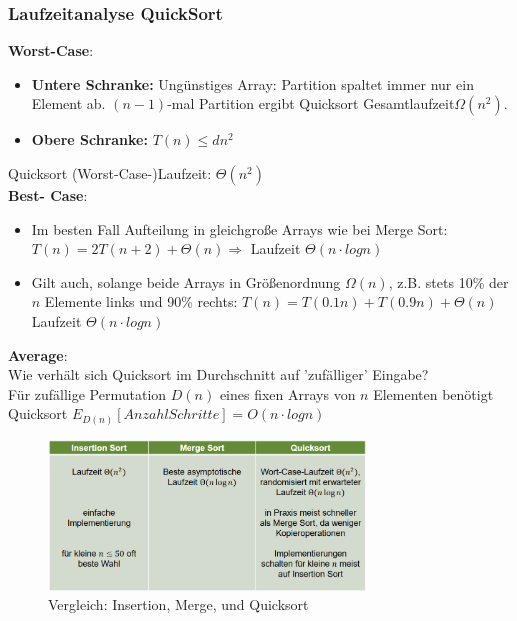 \documentclass{article}
\begin{document}
            \subsubsection{Laufzeitanalyse QuickSort}
                \textbf{Worst-Case}:
                \begin{itemize}
                    \item \textbf{Untere Schranke:} Ungünstiges Array: Partition spaltet immer nur ein Element ab. $(n-1)$-mal Partition ergibt Quicksort Gesamtlaufzeit$\Omega(n^2)$.
                    \item \textbf{Obere Schranke:} $T(n)\leq dn^2$
                \end{itemize}
                Quicksort (Worst-Case-)Laufzeit: $\Theta(n^2)$\\
                \textbf{Best- Case}:
                \begin{itemize}
                    \item Im besten Fall Aufteilung in gleichgroße Arrays wie bei Merge Sort: $T(n)=2T(n+2)+\Theta(n) \Rightarrow$ Laufzeit $\Theta(n\cdot log n)$
                \item Gilt auch, solange beide Arrays in Größenordnung $\Omega(n)$, z.B. stets 10\% der $n$ Elemente links und 90\% rechts: $T(n)=T(0.1n)+T(0.9n)+\Theta(n)$ Laufzeit $\Theta(n\cdot log n)$
                \end{itemize}
                \textbf{Average}:\\
                Wie verhält sich Quicksort im Durchschnitt auf 'zufälliger' Eingabe?\\
                Für zufällige Permutation $D(n)$ eines fixen Arrays von $n$ Elementen benötigt Quicksort $E_{D(n)}[Anzahl Schritte]=O(n\cdot log n)$
            \begin{figure}[ht]
                \centering
                \includegraphics[width=0.75\textwidth]{Bilder/VerglInMeundQu.png}
                \caption{Vergleich: Insertion, Merge, und Quicksort}
                \label{fig:VerglInMeundQu}
            \end{figure}
\end{document}
